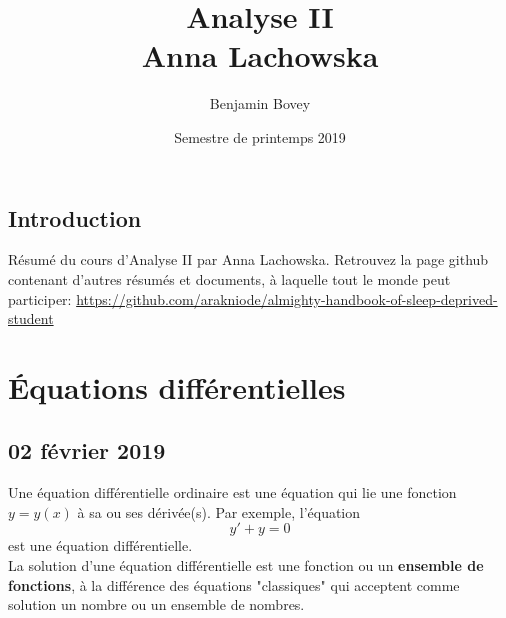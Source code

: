 \documentclass{report}
\title{Analyse II \\ Anna Lachowska}
\author{Benjamin Bovey}
\date{Semestre de printemps 2019}
\begin{document}
\section*{Introduction}
Résumé du cours d'Analyse II par Anna Lachowska. Retrouvez la page github contenant d'autres résumés et documents, à laquelle tout le monde peut participer: \url{https://github.com/arakniode/almighty-handbook-of-sleep-deprived-student}

\chapter{Équations différentielles}

\section{02 février 2019}
Une équation différentielle ordinaire est une équation qui lie une fonction $y = y(x)$ à sa ou ses dérivée(s). Par exemple, l'équation
\begin{equation}
	y' + y = 0
\end{equation}
est une équation différentielle. 
\\
La solution d'une équation différentielle est une fonction ou un \textbf{ensemble de fonctions}, à la différence des équations "classiques" qui acceptent comme solution un nombre ou un ensemble de nombres. 
\end{document}
